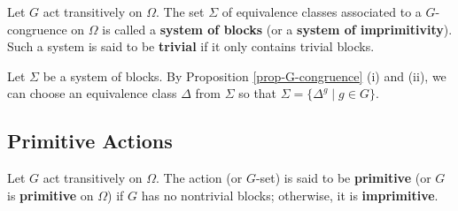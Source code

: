 \begin{definition}
	Let $G$ act transitively on $\Omega$. The set $\Sigma$ of equivalence classes associated to a $G$-congruence on $\Omega$ is called a \textbf{system of blocks} (or a \textbf{system of imprimitivity}). Such a system is said to be \textbf{trivial} if it only contains trivial blocks.
\end{definition}
\begin{remark}
Let $\Sigma$ be a system of blocks. By Proposition \ref{prop-G-congruence} (i) and (ii), we can choose an equivalence class $\Delta$ from $\Sigma$ so that $\Sigma = \{\Delta^g\mid g\in G\}$.
\end{remark}

\subsection{Primitive Actions}

\begin{definition}
	Let $G$ act transitively on $\Omega$. The action (or $G$-set) is said to be \textbf{primitive} (or $G$ is \textbf{primitive} on $\Omega$) if $G$ has no nontrivial blocks; otherwise, it is \textbf{imprimitive}.
\end{definition}

